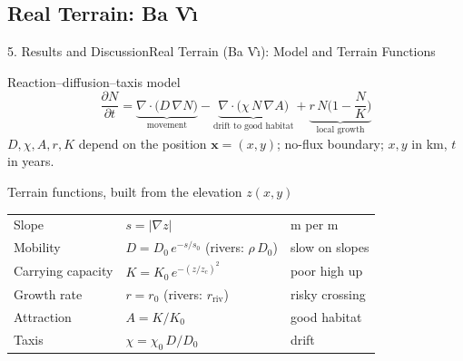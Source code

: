 \documentclass[10pt]{beamer}
\begin{document}
  \subsection{Real Terrain: Ba V\`{\i}}
    \begin{frame}{5. Results and Discussion}{Real Terrain (Ba V\`{\i}): Model and Terrain Functions}
      \begin{block}{Reaction--diffusion--taxis model}
          $$
          \frac{\partial N}{\partial t}
          = \underbrace{\nabla\cdot\big(D\,\nabla N\big)}_{\text{movement}}
          - \underbrace{\nabla\cdot\big(\chi\, N\, \nabla A\big)}_{\text{drift to good habitat}}
          + \underbrace{r\,N\Big(1-\frac{N}{K}\Big)}_{\text{local growth}}
          $$
          {\small $D, \chi, A, r, K$ depend on the position $\mathbf{x} = (x, y)$; no-flux boundary; $x, y$ in km, $t$ in years.}
      \end{block}
      \begin{block}{Terrain functions, built from the elevation $z(x,y)$}
          \centering
          \small
          \renewcommand{\arraystretch}{1.25}
          \begin{tabular}{l l l}
            Slope & $s = |\nabla z|$ & m per m \\
            Mobility & $D = D_0\, e^{-s/s_0}$ \quad (rivers: $\rho\, D_0$) & slow on slopes \\
            Carrying capacity & $K = K_0\, e^{-(z/z_c)^2}$ & poor high up \\
            Growth rate & $r = r_0$ \quad (rivers: $r_{\mathrm{riv}}$) & risky crossing \\
            Attraction & $A = K / K_0$ & good habitat \\
            Taxis & $\chi = \chi_0\, D / D_0$ & drift \\
          \end{tabular}
      \end{block}
    \end{frame}
\end{document}
